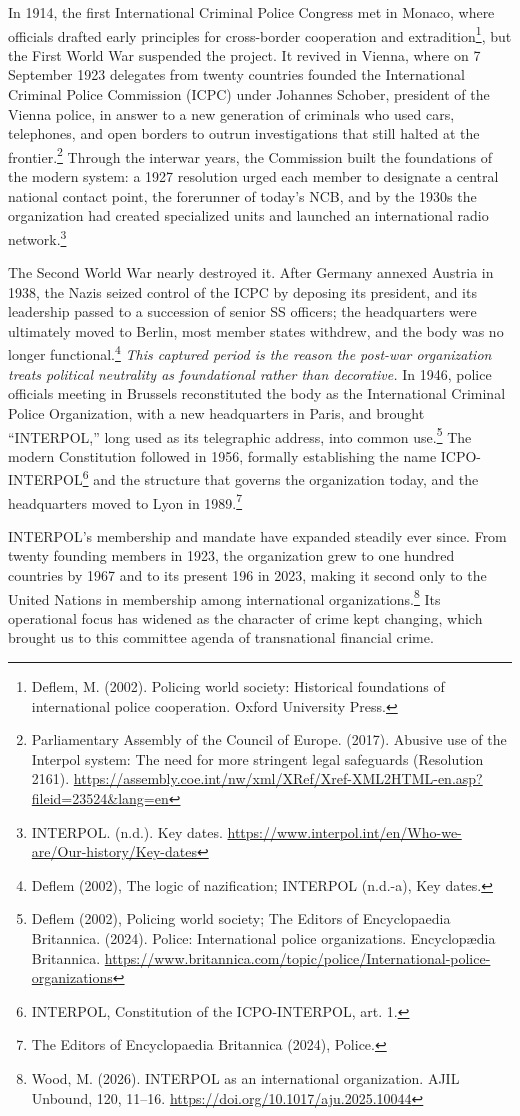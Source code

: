 In 1914, the first International Criminal Police Congress met in Monaco, where officials drafted early principles for cross-border cooperation and extradition\footnote{Deflem, M. (2002). Policing world society: Historical foundations of international police cooperation. Oxford University Press.}, but the First World War suspended the project. It revived in Vienna, where on 7 September 1923 delegates from twenty countries founded the International Criminal Police Commission (ICPC) under Johannes Schober, president of the Vienna police, in answer to a new generation of criminals who used cars, telephones, and open borders to outrun investigations that still halted at the frontier.\footnote{Parliamentary Assembly of the Council of Europe. (2017). Abusive use of the Interpol system: The need for more stringent legal safeguards (Resolution 2161). \url{https://assembly.coe.int/nw/xml/XRef/Xref-XML2HTML-en.asp?fileid=23524&lang=en}} Through the interwar years, the Commission built the foundations of the modern system: a 1927 resolution urged each member to designate a central national contact point, the forerunner of today’s NCB, and by the 1930s the organization had created specialized units and launched an international radio network.\footnote{INTERPOL. (n.d.). Key dates. \url{https://www.interpol.int/en/Who-we-are/Our-history/Key-dates}}

The Second World War nearly destroyed it. After Germany annexed Austria in 1938, the Nazis seized control of the ICPC by deposing its president, and its leadership passed to a succession of senior SS officers; the headquarters were ultimately moved to Berlin, most member states withdrew, and the body was no longer functional.\footnote{Deflem (2002), The logic of nazification; INTERPOL (n.d.-a), Key dates.} \emph{This captured period is the reason the post-war organization treats political neutrality as foundational rather than decorative.} In 1946, police officials meeting in Brussels reconstituted the body as the International Criminal Police Organization, with a new headquarters in Paris, and brought “INTERPOL,” long used as its telegraphic address, into common use.\footnote{Deflem (2002), Policing world society; The Editors of Encyclopaedia Britannica. (2024). Police: International police organizations. Encyclopædia Britannica. \url{https://www.britannica.com/topic/police/International-police-organizations}} The modern Constitution followed in 1956, formally establishing the name ICPO-INTERPOL\footnote{INTERPOL, Constitution of the ICPO-INTERPOL, art. 1.} and the structure that governs the organization today, and the headquarters moved to Lyon in 1989.\footnote{The Editors of Encyclopaedia Britannica (2024), Police.}

INTERPOL’s membership and mandate have expanded steadily ever since. From twenty founding members in 1923, the organization grew to one hundred countries by 1967 and to its present 196 in 2023, making it second only to the United Nations in membership among international organizations.\footnote{Wood, M. (2026). INTERPOL as an international organization. AJIL Unbound, 120, 11–16. \url{https://doi.org/10.1017/aju.2025.10044}} Its operational focus has widened as the character of crime kept changing, which brought us to this committee agenda of transnational financial crime.
